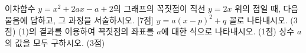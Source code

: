 이차함수 $y=x^2+2ax-a+2$의 그래프의 꼭짓점이 직선 $y=2x$ 위의 점일 때, 다음 물음에 답하고, 그 과정을 서술하시오.  \mbox{[7점]}
 $y=a(x-p)^2+q$ 꼴로 나타내시오. (3점)
 (1)의 결과를 이용하여 꼭짓점의 좌표를 $a$에 대한 식으로 나타내시오. (1점)
 상수 $a$의 값을 모두 구하시오. (3점)
